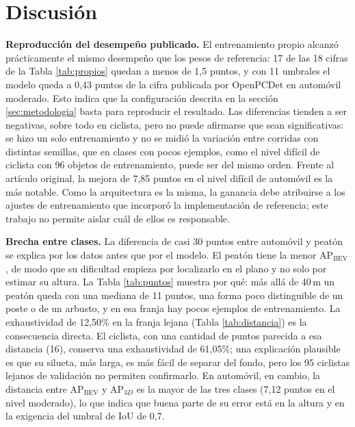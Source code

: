\documentclass[11pt,letterpaper]{article}
\begin{document}
\section{Discusión}
\label{sec:discusion}

\textbf{Reproducción del desempeño publicado.} El entrenamiento propio alcanzó prácticamente el mismo desempeño que los pesos de referencia: 17 de las 18 cifras de la Tabla \ref{tab:propios} quedan a menos de 1,5 puntos, y con 11 umbrales el modelo queda a 0,43 puntos de la cifra publicada por OpenPCDet en automóvil moderado. Esto indica que la configuración descrita en la sección \ref{sec:metodologia} basta para reproducir el resultado. Las diferencias tienden a ser negativas, sobre todo en ciclista, pero no puede afirmarse que sean significativas: se hizo un solo entrenamiento y no se midió la variación entre corridas con distintas semillas, que en clases con pocos ejemplos, como el nivel difícil de ciclista con 96 objetos de entrenamiento, puede ser del mismo orden. Frente al artículo original, la mejora de 7,85 puntos en el nivel difícil de automóvil es la más notable. Como la arquitectura es la misma, la ganancia debe atribuirse a los ajustes de entrenamiento que incorporó la implementación de referencia; este trabajo no permite aislar cuál de ellos es responsable.

\textbf{Brecha entre clases.} La diferencia de casi 30 puntos entre automóvil y peatón se explica por los datos antes que por el modelo. El peatón tiene la menor AP$_{\text{BEV}}$, de modo que su dificultad empieza por localizarlo en el plano y no solo por estimar su altura. La Tabla \ref{tab:puntos} muestra por qué: más allá de 40\,m un peatón queda con una mediana de 11 puntos, una forma poco distinguible de un poste o de un arbusto, y en esa franja hay pocos ejemplos de entrenamiento. La exhaustividad de 12,50\% en la franja lejana (Tabla \ref{tab:distancia}) es la consecuencia directa. El ciclista, con una cantidad de puntos parecida a esa distancia (16), conserva una exhaustividad de 61,05\%; una explicación plausible es que su silueta, más larga, es más fácil de separar del fondo, pero los 95 ciclistas lejanos de validación no permiten confirmarlo. En automóvil, en cambio, la distancia entre AP$_{\text{BEV}}$ y AP$_{3D}$ es la mayor de las tres clases (7,12 puntos en el nivel moderado), lo que indica que buena parte de su error está en la altura y en la exigencia del umbral de IoU de 0,7.
\end{document}

